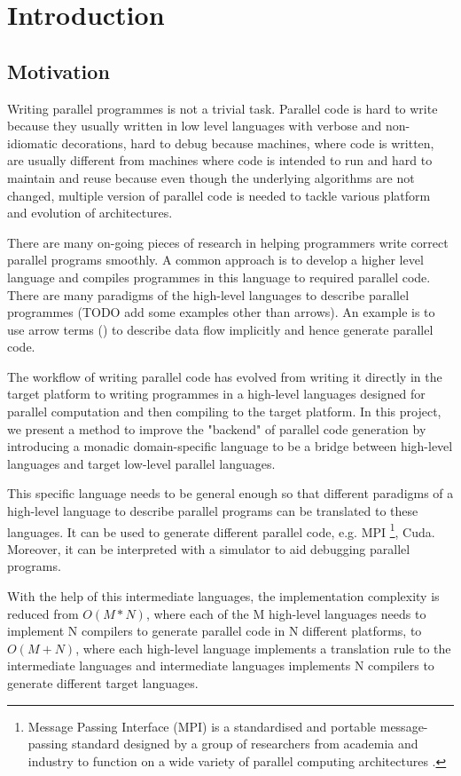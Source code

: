\chapter{Introduction}
\section{Motivation} \label{i:m}
Writing parallel programmes is not a trivial task. Parallel code is hard to write because they usually written in low level languages with verbose and non-idiomatic decorations, hard to debug because machines, where code is written, are usually different from machines where code is intended to run and hard to maintain and reuse because even though the underlying algorithms are not changed, multiple version of parallel code is needed to tackle various platform and evolution of architectures.

There are many on-going pieces of research in helping programmers write correct parallel programs smoothly. A common approach is to develop a higher level language and compiles programmes in this language to required parallel code. There are many paradigms of the high-level languages to describe parallel programmes (TODO add some examples other than arrows). An example is to use arrow terms () to describe data flow implicitly and hence generate parallel code.

The workflow of writing parallel code has evolved from writing it directly in the target platform to writing programmes in a high-level languages designed for parallel computation and then compiling to the target platform. In this project, we present a method to improve the "backend" of parallel code generation by introducing a monadic domain-specific language to be a bridge between high-level languages and target low-level parallel languages.

This specific language needs to be general enough so that different paradigms of a high-level language to describe parallel programs can be translated to these languages. It can be used to generate different parallel code, e.g. MPI \footnote{Message Passing Interface (MPI) is a standardised and portable message-passing standard designed by a group of researchers from academia and industry to function on a wide variety of parallel computing architectures \cite{MessagePassingInterface2018}.}, Cuda. Moreover, it can be interpreted with a simulator to aid debugging parallel programs.

With the help of this intermediate languages, the implementation complexity is reduced from $O(M * N)$, where each of the M high-level languages needs to implement N compilers to generate parallel code in N different platforms, to $O(M + N)$, where each high-level language implements a translation rule to the intermediate languages and intermediate languages implements N compilers to generate different target languages.

